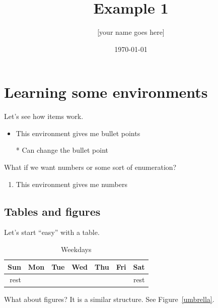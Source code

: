 \documentclass[11pt]{article}    %
\title{Example 1}
\author{[your name goes here]}
\date{\today} %
\begin{document}
\maketitle


\section{Learning some environments}

Let's see how items work.

\begin{itemize}
	\item This environment gives me bullet points
	\item[*] Can change the bullet point
\end{itemize}

\noindent What if we want numbers or some sort of enumeration?

\begin{enumerate}
	\item This environment gives me numbers
\end{enumerate}


\subsection{Tables and figures}

Let's start ``easy'' with a table.

\begin{table}[h!]
  \begin{center}
    \begin{tabular}{|r |r |r |r |r |r |r |} %
    \hline %
    Sun & Mon & Tue & Wed & Thu & Fri & Sat \\
    \hline
    rest & &  & &  &  & rest \\
    \hline
    \end{tabular}
  \end{center}
  \caption{Weekdays}
  \label{table}
\end{table}

What about figures? It is a similar structure. See Figure~\ref{umbrella}.
\end{document}
